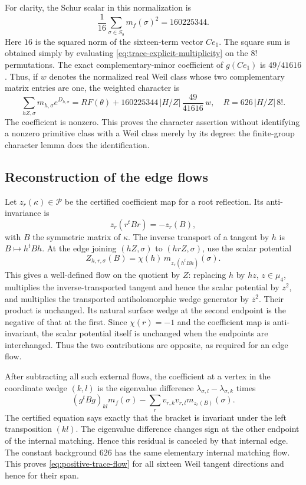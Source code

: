 \documentclass[11pt]{article}
\theoremstyle{definition}
\theoremstyle{remark}
\begin{document}
For clarity, the Schur scalar in this normalization is
\[
 \frac1{16}\sum_{\sigma\in S_8}m_f(\sigma)^2
 =160225344.
\]
Here \(16\) is the squared norm of the sixteen-term vector
\(Ce_1\).  The square sum is obtained simply by evaluating
\eqref{eq:trace-explicit-multiplicity} on the \(8!\) permutations.
The exact complementary-minor coefficient of \(g(Ce_1)\) is
\(49/41616\).  Thus, if \(w\) denotes the normalized real Weil
class whose two complementary matrix entries are one, the weighted
character is
\begin{equation}
 \sum_{hZ,\sigma}m_{h,\sigma}e^{D_{h,\sigma}}
 =R F(\theta)+
  160225344\,|H/Z|\,\frac{49}{41616}\,w,
 \quad R=626\,|H/Z|\,8!.
 \label{eq:trace-positive-character}
\end{equation}
The coefficient is nonzero.  This proves the character assertion
without identifying a nonzero primitive class with a Weil class
merely by its degree: the finite-group character lemma does the
identification.

\subsection{Reconstruction of the edge flows}

Let \(z_r(\kappa)\in\mathcal P\) be the certified coefficient
map for a root reflection.  Its anti-invariance is
\[
 z_r(r^tBr)=-z_r(B),
\]
with \(B\) the symmetric matrix of \(\kappa\).  The inverse
transport of a tangent by \(h\) is \(B\mapsto h^tBh\).
At the edge joining \((hZ,\sigma)\) to \((hrZ,\sigma)\),
use the scalar potential
\[
 Z_{h,r,\sigma}(B)=
  \chi(h)\,m_{z_r(h^tBh)}(\sigma).
\]
This gives a well-defined flow on the quotient by \(Z\): replacing
\(h\) by \(hz\), \(z\in\mu_4\), multiplies the inverse-transported
tangent and hence the scalar potential by \(z^2\), and multiplies
the transported antiholomorphic wedge generator by \(\overline z^2\).
Their product is unchanged.
Its natural surface wedge at the second endpoint is the negative
of that at the first.  Since \(\chi(r)=-1\) and the coefficient
map is anti-invariant, the scalar potential itself is unchanged
when the endpoints are interchanged.  Thus the two contributions
are opposite, as required for an edge flow.

After subtracting all such external flows, the coefficient at a
vertex in the coordinate wedge \((k,l)\) is the eigenvalue
difference \(\lambda_{\sigma,l}-\lambda_{\sigma,k}\) times
\[
 (g^tBg)_{kl}m_f(\sigma)
   -\sum_r v_{r,k}v_{r,l}m_{z_r(B)}(\sigma).
\]
The certified equation says exactly that the bracket is invariant
under the left transposition \((kl)\).  The eigenvalue difference
changes sign at the other endpoint of the internal matching.
Hence this residual is canceled by that internal edge.  The
constant background \(626\) has the same elementary internal
matching flow.  This proves \eqref{eq:positive-trace-flow} for all
sixteen Weil tangent directions and hence for their span.
\end{document}
